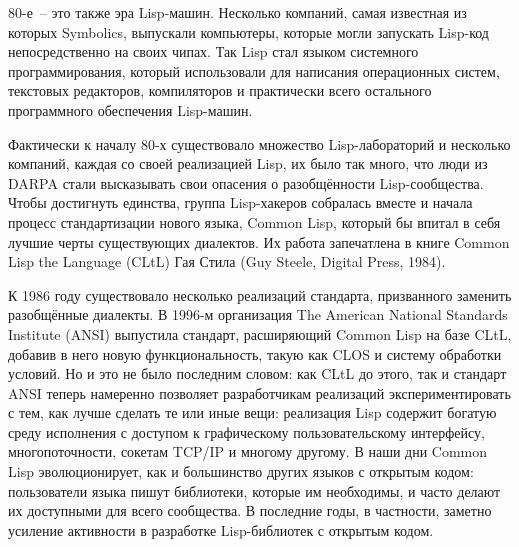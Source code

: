 80-е~-- это также эра Lisp-машин. Несколько компаний, самая известная из которых
Symbolics, выпускали компьютеры, которые могли запускать Lisp-код непосредственно на своих
чипах. Так Lisp стал языком системного программирования, который использовали для
написания операционных систем, текстовых редакторов, компиляторов и практически всего
остального программного обеспечения Lisp-ма\-шин.

Фактически к началу 80-х существовало множество Lisp-ла\-бо\-ра\-то\-рий и несколько компаний,
каждая со своей реализацией Lisp, их было так много, что люди из DARPA стали высказывать
свои опасения о разобщённости Lisp-со\-об\-щест\-ва. Чтобы достигнуть единства, группа
Lisp-ха\-ке\-ров собралась вместе и начала процесс стандартизации нового языка, Common Lisp,
который бы впитал в себя лучшие черты существующих диалектов. Их работа запечатлена в
книге Common Lisp the Language (CLtL) Гая Стила (Guy Steele, Digital Press, 1984).

К 1986 году существовало несколько реализаций стандарта, призванного заменить разобщённые
диалекты. В 1996-м организация The American National Standards Institute (ANSI) выпустила
стандарт, расширяющий Common Lisp на базе CLtL, добавив в него новую функциональность,
такую как CLOS и систему обработки условий. Но и это не было последним словом: как CLtL
до этого, так и стандарт ANSI теперь намеренно позволяет разработчикам реализаций
экспериментировать с тем, как лучше сделать те или иные вещи: реализация Lisp содержит
богатую среду исполнения с доступом к графическому пользовательскому интерфейсу,
многопоточности, сокетам TCP/IP и многому другому. В наши дни Common Lisp эволюционирует,
как и большинство других языков с открытым кодом: пользователи языка пишут
библиотеки, которые им необходимы, и часто делают их доступными для всего сообщества. В
последние годы, в частности, заметно усиление активности в разработке Lisp-би\-бли\-о\-тек 
с открытым кодом.

